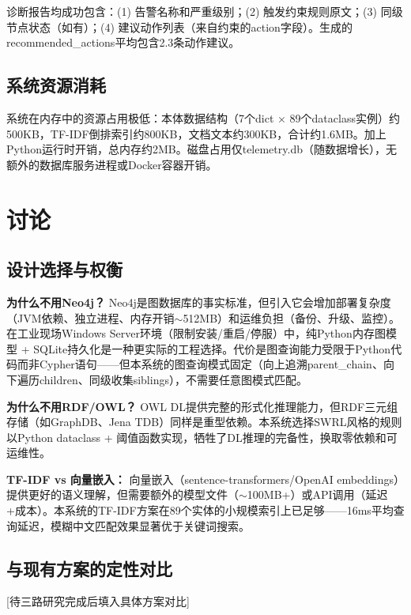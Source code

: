 \documentclass[12pt,a4paper]{article}
\begin{document}
诊断报告均成功包含：(1) 告警名称和严重级别；(2) 触发约束规则原文；(3) 同级节点状态（如有）；(4) 建议动作列表（来自约束的action字段）。生成的recommended\_actions平均包含2.3条动作建议。

\subsection{系统资源消耗}

系统在内存中的资源占用极低：本体数据结构（7个dict $\times$ 89个dataclass实例）约500KB，TF-IDF倒排索引约800KB，文档文本约300KB，合计约1.6MB。加上Python运行时开销，总内存约2MB。磁盘占用仅telemetry.db（随数据增长），无额外的数据库服务进程或Docker容器开销。

\section{讨论}

\subsection{设计选择与权衡}

\textbf{为什么不用Neo4j？} Neo4j是图数据库的事实标准，但引入它会增加部署复杂度（JVM依赖、独立进程、内存开销$\sim$512MB）和运维负担（备份、升级、监控）。在工业现场Windows Server环境（限制安装/重启/停服）中，纯Python内存图模型 + SQLite持久化是一种更实际的工程选择。代价是图查询能力受限于Python代码而非Cypher语句——但本系统的图查询模式固定（向上追溯parent\_chain、向下遍历children、同级收集siblings），不需要任意图模式匹配。

\textbf{为什么不用RDF/OWL？} OWL DL提供完整的形式化推理能力，但RDF三元组存储（如GraphDB、Jena TDB）同样是重型依赖。本系统选择SWRL风格的规则以Python dataclass + 阈值函数实现，牺牲了DL推理的完备性，换取零依赖和可运维性。

\textbf{TF-IDF vs 向量嵌入：} 向量嵌入（sentence-transformers/OpenAI embeddings）提供更好的语义理解，但需要额外的模型文件（$\sim$100MB+）或API调用（延迟+成本）。本系统的TF-IDF方案在89个实体的小规模索引上已足够——16ms平均查询延迟，模糊中文匹配效果显著优于关键词搜索。

\subsection{与现有方案的定性对比}

[待三路研究完成后填入具体方案对比]
\end{document}
